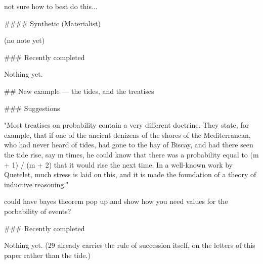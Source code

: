 not sure how to best do this...

#### Synthetic (Materialist)

(no note yet)

### Recently completed

Nothing yet.


## New example — the tides, and the treatises

### Suggestions

"Most treatises on probability contain a very different doctrine. They state, for example, that if one of the ancient denizens of the shores of the Mediterranean, who had never heard of tides, had gone to the bay of Biscay, and had there seen the tide rise, say m times, he could know that there was a probability equal to (m + 1) / (m + 2) that it would rise the next time. In a well-known work by Quetelet, much stress is laid on this, and it is made the foundation of a theory of inductive reasoning."

could have bayes theorem pop up and show how you need values for the porbability of events?

### Recently completed

Nothing yet. (29 already carries the rule of succession itself, on the letters
of this paper rather than the tide.)
